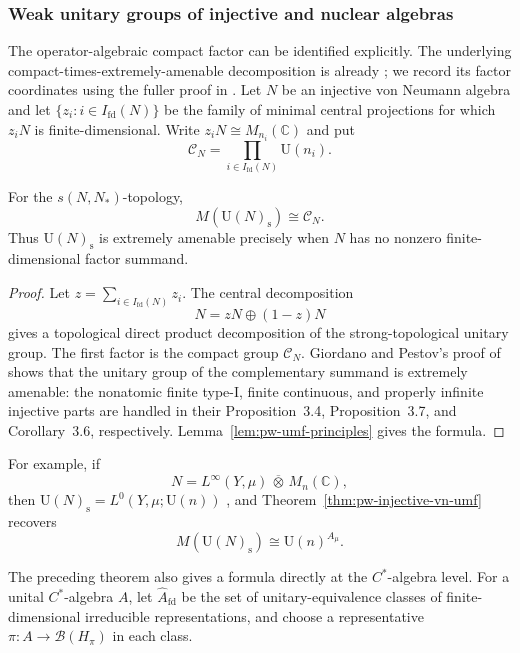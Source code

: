 \subsubsection{Weak unitary groups of injective and nuclear algebras}

The operator-algebraic compact factor can be identified explicitly.
The underlying compact-times-extremely-amenable decomposition is already
\cite[Corollary~3.6]{GiordanoPestov2002}; we record its factor coordinates using the fuller
proof in \cite{GiordanoPestov2007}. Let \(N\)
be an injective von Neumann algebra and let
\(\{z_i:i\in I_{\mathrm{fd}}(N)\}\) be the family of minimal central
projections for which \(z_iN\) is finite-dimensional. Write
\(z_iN\cong M_{n_i}(\mathbb C)\) and put
\[
\mathcal C_N=\prod_{i\in I_{\mathrm{fd}}(N)}\mathrm U(n_i).
\]

\begin{theorem}\label{thm:pw-injective-vn-umf}
For the \(s(N,N_{\ast})\)-topology,
\[
M(\mathrm U(N)_{\mathrm s})\cong\mathcal C_N.
\]
Thus \(\mathrm U(N)_{\mathrm s}\) is extremely amenable precisely when \(N\) has no
nonzero finite-dimensional factor summand.
\end{theorem}

\begin{proof}
Let \(z=\sum_{i\in I_{\mathrm{fd}}(N)}z_i\). The central decomposition
\[
N=zN\oplus(1-z)N
\]
gives a topological direct product decomposition of the strong-topological
unitary group. The first factor is the compact group \(\mathcal C_N\).
Giordano and Pestov's proof of \cite[Theorem~3.3]{GiordanoPestov2007} shows that the unitary
group of the complementary summand is extremely amenable: the nonatomic
finite type-I, finite continuous, and properly infinite injective parts are
handled in their Proposition~3.4, Proposition~3.7, and Corollary~3.6,
respectively. Lemma~\ref{lem:pw-umf-principles} gives the formula.
\end{proof}

For example, if
\[
N=L^\infty(Y,\mu)\,\overline\otimes\,M_n(\mathbb C),
\]
then \(\mathrm U(N)_{\mathrm s}=L^0(Y,\mu;\mathrm U(n))\)
\cite[Lemma~3.2]{GiordanoPestov2007}, and Theorem~\ref{thm:pw-injective-vn-umf} recovers
\[
M(\mathrm U(N)_{\mathrm s})\cong\mathrm U(n)^{A_\mu}.
\]

The preceding theorem also gives a formula directly at the \(C^*\)-algebra
level. For a unital \(C^*\)-algebra \(A\), let
\(\widehat A_{\mathrm{fd}}\) be the set of unitary-equivalence classes of
finite-dimensional irreducible representations, and choose a representative
\(\pi:A\to\mathcal B(H_\pi)\) in each class.

